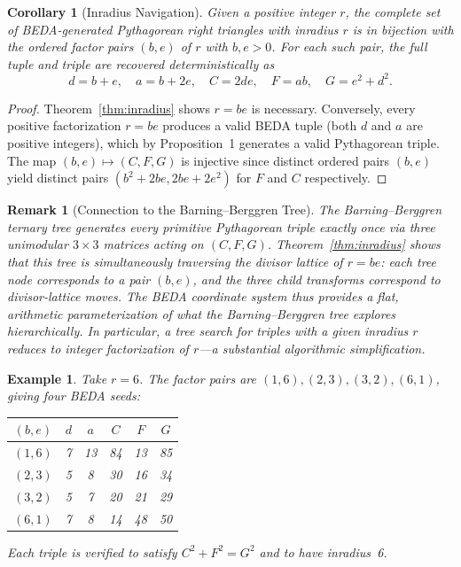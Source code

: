 \documentclass[12pt]{article}
\newtheorem{corollary}[theorem]{Corollary}
\newtheorem{remark}{Remark}
\newtheorem{example}{Example}
\begin{document}
\begin{corollary}[Inradius Navigation]\label{cor:nav}
Given a positive integer $r$, the complete set of BEDA-generated Pythagorean right triangles with inradius $r$ is in bijection with the ordered factor pairs $(b, e)$ of $r$ with $b, e > 0$.  For each such pair, the full tuple and triple are recovered deterministically as
\[
  d = b + e, \quad a = b + 2e, \quad C = 2de, \quad F = ab, \quad G = e^2 + d^2.
\]
\end{corollary}

\begin{proof}
Theorem~\ref{thm:inradius} shows $r = be$ is necessary.  Conversely, every positive factorization $r = be$ produces a valid BEDA tuple (both $d$ and $a$ are positive integers), which by Proposition~1 generates a valid Pythagorean triple.  The map $(b,e) \mapsto (C,F,G)$ is injective since distinct ordered pairs $(b,e)$ yield distinct pairs $(b^2{+}2be, 2be{+}2e^2)$ for $F$ and $C$ respectively.
\end{proof}

\begin{remark}[Connection to the Barning--Berggren Tree]
The Barning--Berggren ternary tree \cite{barning,berggren} generates every primitive Pythagorean triple exactly once via three unimodular $3{\times}3$ matrices acting on $(C,F,G)$.  Theorem~\ref{thm:inradius} shows that this tree is simultaneously traversing the \emph{divisor lattice} of $r = be$: each tree node corresponds to a pair $(b,e)$, and the three child transforms correspond to divisor-lattice moves.  The BEDA coordinate system thus provides a flat, arithmetic parameterization of what the Barning--Berggren tree explores hierarchically.  In particular, a tree search for triples with a given inradius $r$ reduces to integer factorization of $r$---a substantial algorithmic simplification.
\end{remark}

\begin{example}
Take $r = 6$.  The factor pairs are $(1,6),(2,3),(3,2),(6,1)$, giving four BEDA seeds:
\begin{center}
\begin{tabular}{cccccc}
\toprule
$(b,e)$ & $d$ & $a$ & $C$ & $F$ & $G$ \\
\midrule
$(1,6)$ & 7 & 13 & 84 & 13 & 85 \\
$(2,3)$ & 5 & 8  & 30 & 16 & 34 \\
$(3,2)$ & 5 & 7  & 20 & 21 & 29 \\
$(6,1)$ & 7 & 8  & 14 & 48 & 50 \\
\bottomrule
\end{tabular}
\end{center}
Each triple is verified to satisfy $C^2 + F^2 = G^2$ and to have inradius~6.
\end{example}
\end{document}
